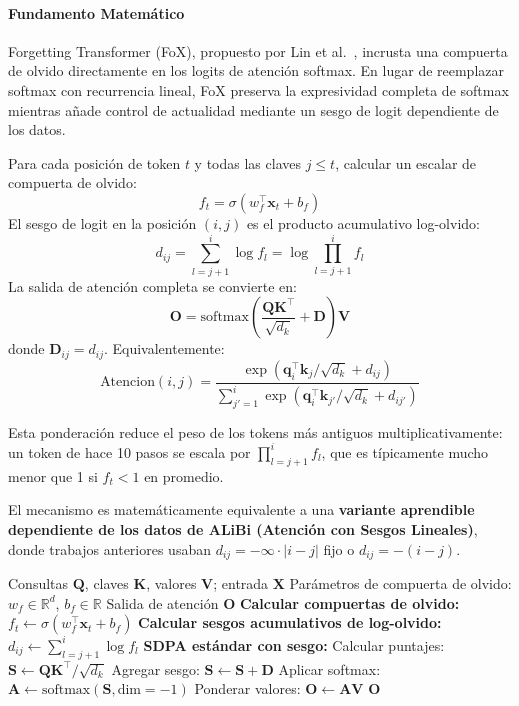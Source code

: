 \paragraph{Fundamento Matemático}

Forgetting Transformer (FoX), propuesto por Lin et al.~\citep{lin_forgetting_transformer_2025}, incrusta una compuerta de olvido directamente en los logits de atención softmax. En lugar de reemplazar softmax con recurrencia lineal, FoX preserva la expresividad completa de softmax mientras añade control de actualidad mediante un sesgo de logit dependiente de los datos.

Para cada posición de token $t$ y todas las claves $j \le t$, calcular un escalar de compuerta de olvido:
\[
f_t = \sigma(w_f^\top \mathbf{x}_t + b_f)
\]
El sesgo de logit en la posición $(i,j)$ es el producto acumulativo log-olvido:
\[
d_{ij} = \sum_{l=j+1}^{i} \log f_l = \log \prod_{l=j+1}^{i} f_l
\]
La salida de atención completa se convierte en:
\[
\mathbf{O} = \text{softmax}\left(\frac{\mathbf{Q}\mathbf{K}^\top}{\sqrt{d_k}} + \mathbf{D}\right) \mathbf{V}
\]
donde $\mathbf{D}_{ij} = d_{ij}$. Equivalentemente:
\[
\text{Atencion}(i,j) = \frac{\exp(\mathbf{q}_i^\top \mathbf{k}_j / \sqrt{d_k} + d_{ij})}{\sum_{j'=1}^{i} \exp(\mathbf{q}_i^\top \mathbf{k}_{j'} / \sqrt{d_k} + d_{ij'})}
\]

Esta ponderación reduce el peso de los tokens más antiguos multiplicativamente: un token de hace 10 pasos se escala por $\prod_{l=j+1}^{i} f_l$, que es típicamente mucho menor que 1 si $f_t < 1$ en promedio.

El mecanismo es matemáticamente equivalente a una \textbf{variante aprendible dependiente de los datos de ALiBi (Atención con Sesgos Lineales)}, donde trabajos anteriores usaban $d_{ij} = -\infty \cdot |i-j|$ fijo o $d_{ij} = -(i-j)$.

\begin{algorithm}[H]
\caption{FoX: Atención con Olvido y Sesgo de Actualidad}
\begin{algorithmic}[1]
\Require Consultas $\mathbf{Q}$, claves $\mathbf{K}$, valores $\mathbf{V}$; entrada $\mathbf{X}$
\Require Parámetros de compuerta de olvido: $w_f \in \mathbb{R}^d$, $b_f \in \mathbb{R}$
\Ensure Salida de atención $\mathbf{O}$
\State \textbf{Calcular compuertas de olvido:}
    \State $f_t \gets \sigma(w_f^\top \mathbf{x}_t + b_f)$ 
\EndFor
\State \textbf{Calcular sesgos acumulativos de log-olvido:}
        \State $d_{ij} \gets \sum_{l=j+1}^{i} \log f_l$ 
    \EndFor
\EndFor
\State \textbf{SDPA estándar con sesgo:}
\State Calcular puntajes: $\mathbf{S} \gets \mathbf{Q}\mathbf{K}^\top / \sqrt{d_k}$
\State Agregar sesgo: $\mathbf{S} \gets \mathbf{S} + \mathbf{D}$
\State Aplicar softmax: $\mathbf{A} \gets \text{softmax}(\mathbf{S}, \text{dim}=-1)$
\State Ponderar valores: $\mathbf{O} \gets \mathbf{A} \mathbf{V}$
\Return $\mathbf{O}$
\end{algorithmic}
\end{algorithm}

